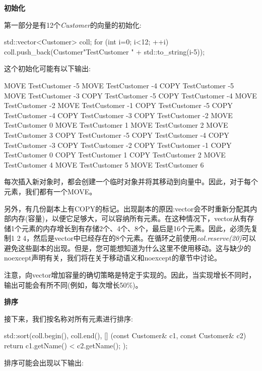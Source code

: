 \textbf{初始化}

第一部分是有12个\textit{Customer}的向量的初始化:

\begin{cppcode}
std::vector<Customer> coll;
for (int i=0; i<12; ++i) {
	coll.push_back(Customer{"TestCustomer " + std::to_string(i-5)});
}
\end{cppcode}

这个初始化可能有以下输出:

\begin{shell}
MOVE TestCustomer -5
MOVE TestCustomer -4
COPY TestCustomer -5
MOVE TestCustomer -3
COPY TestCustomer -5
COPY TestCustomer -4
MOVE TestCustomer -2
MOVE TestCustomer -1
COPY TestCustomer -5
COPY TestCustomer -4
COPY TestCustomer -3
COPY TestCustomer -2
MOVE TestCustomer 0
MOVE TestCustomer 1
MOVE TestCustomer 2
MOVE TestCustomer 3
COPY TestCustomer -5
COPY TestCustomer -4
COPY TestCustomer -3
COPY TestCustomer -2
COPY TestCustomer -1
COPY TestCustomer 0
COPY TestCustomer 1
COPY TestCustomer 2
MOVE TestCustomer 4
MOVE TestCustomer 5
MOVE TestCustomer 6
\end{shell}

每次插入新对象时，都会创建一个临时对象并将其移动到向量中。因此，对于每个元素，我们都有一个MOVE。

另外，有几份副本上有COPY的标记。出现副本的原因:vector会不时重新分配其内部内存(容量)，以便它足够大，可以容纳所有元素。在这种情况下，vector从有存储1个元素的内存增长到有存储2个、4个、8个，最后是16个元素。因此，必须先复制1 2 4，然后是vector中已经存在的8个元素。在循环之前使用\textit{col.reserve(20)}可以避免这些副本的出现。但是，您可能想知道为什么这里不使用移动。这与缺少的noexcept声明有关，我们将在关于移动语义和noexcept的章节中讨论。

注意，向vector增加容量的确切策略是特定于实现的。因此，当实现增长不同时，输出可能会有所不同(例如，每次增长50\%)。

\textbf{排序}

接下来，我们按名称对所有元素进行排序:

\begin{cppcode}
std::sort(coll.begin(), coll.end(),
	[] (const Customer& c1, const Customer& c2) {
		return c1.getName() < c2.getName();
	});
\end{cppcode}

排序可能会出现以下输出:

